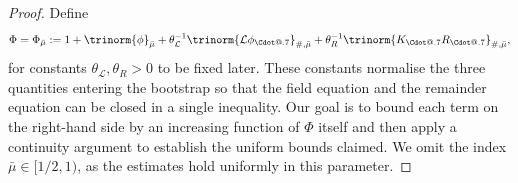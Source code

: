 \documentclass{article}
\makeatletter
\numberwithin{equation}{section}
\newcommand{\assign}{:=}
\newcommand*\Cdot{{\mathpalette\Cdot@{.7}}}
\newcommand*\Cdot@[2]{\mathbin{\vcenter{\hbox{\scalebox{#2}{\hspace{0.1mm}$\m@th#1\bullet$\hspace{0.1mm}}}}}}
\theoremstyle{plain}
\theoremstyle{definition}
\makeatother
\begin{document}
\begin{proof}
  Define
  \begin{equation}
    \Phi = \Phi_{\bar{\mu}} \assign 1 + \trinorm{ \phi
    }_{\bar{\mu}} + \theta_{\mathcal{L}}^{- 1}  \trinorm{
    \mathcal{L} \phi_{\Cdot} }_{\#, \bar{\mu}} + \theta_R^{- 1} 
    \trinorm{ K_{\Cdot} R_{\Cdot} }_{\#, \bar{\mu}},
    \label{eq:def-Phi}
  \end{equation}
  for constants $\theta_{\mathcal{L}}, \theta_R > 0$ to be fixed later. 
  These constants normalise the three quantities entering the bootstrap so that
  the field equation and the remainder equation can be closed in a single
  inequality. 
  Our
  goal is to bound each term on the right-hand side by an increasing function
  of $\Phi$ itself and then apply a continuity argument to establish the
  uniform bounds claimed. We omit the index $\bar{\mu} \in [1 / 2,
  1)$, as the estimates hold uniformly in this parameter.
  

\end{proof}
\end{document}
